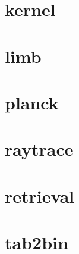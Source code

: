 \section{kernel}

\section{limb}

\section{planck}

\section{raytrace}

\section{retrieval}

\section{tab2bin}